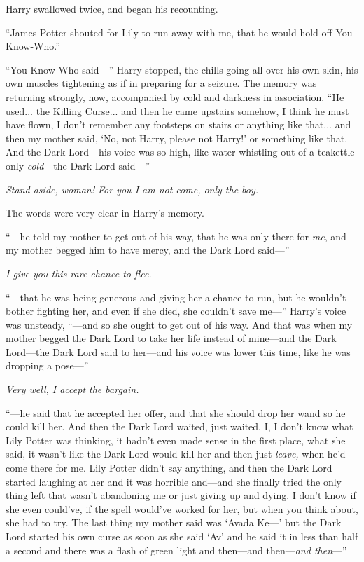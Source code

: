 Harry swallowed twice, and began his recounting.

“James Potter shouted for Lily to run away with me, that he would hold off You-Know-Who.”

“You-Know-Who said—” Harry stopped, the chills going all over his own skin, his own muscles tightening as if in preparing for a seizure. The memory was returning strongly, now, accompanied by cold and darkness in association. “He used... the Killing Curse... and then he came upstairs somehow, I think he must have flown, I don’t remember any footsteps on stairs or anything like that... and then my mother said, ‘No, not Harry, please not Harry!’ or something like that. And the Dark Lord—his voice was so high, like water whistling out of a teakettle only \emph{cold}—the Dark Lord said—”

\emph{Stand aside, woman! For you I am not come, only the boy.}

The words were very clear in Harry’s memory.

“—he told my mother to get out of his way, that he was only there for \emph{me}, and my mother begged him to have mercy, and the Dark Lord said—”

\emph{I give you this rare chance to flee.}

“—that he was being generous and giving her a chance to run, but he wouldn’t bother fighting her, and even if she died, she couldn’t save me—” Harry’s voice was unsteady, “—and so she ought to get out of his way. And that was when my mother begged the Dark Lord to take her life instead of mine—and the Dark Lord—the Dark Lord said to her—and his voice was lower this time, like he was dropping a pose—”

\emph{Very well, I accept the bargain.}

“—he said that he accepted her offer, and that she should drop her wand so he could kill her. And then the Dark Lord waited, just waited. I, I don’t know what Lily Potter was thinking, it hadn’t even made sense in the first place, what she said, it wasn’t like the Dark Lord would kill her and then just \emph{leave,} when he’d come there for me. Lily Potter didn’t say anything, and then the Dark Lord started laughing at her and it was horrible and—and she finally tried the only thing left that wasn’t abandoning me or just giving up and dying. I don’t know if she even could’ve, if the spell would’ve worked for her, but when you think about, she had to try. The last thing my mother said was ‘Avada Ke—’ but the Dark Lord started his own curse as soon as she said ‘Av’ and he said it in less than half a second and there was a flash of green light and then—and then—\emph{and then}—”

